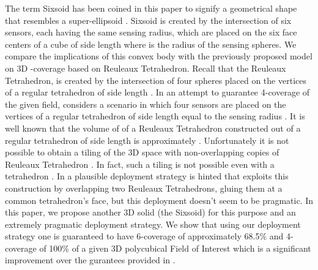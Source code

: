 \documentclass[conference]{IEEEtran}
\begin{document}
The term Sixsoid has been coined in this paper to signify a geometrical shape that resembles a super-ellipsoid \cite{W}. 
Sixsoid is created by the intersection of six sensors, each having the same sensing radius, which are placed on the six face centers of a cube of side length  where  is the radius of the sensing spheres. We compare the implications of this convex body with the previously proposed model on 3D -coverage based on Reuleaux Tetrahedron. Recall that the Reuleaux Tetrahedron, is created by the intersection of four spheres placed on the vertices of a regular tetrahedron of side length . In an attempt to guarantee 4-coverage of the given field, \cite{AD1} considers a scenario in which four sensors are placed on the vertices of a regular tetrahedron of side length equal to the sensing radius . It is well known that the volume of 
of a Reuleaux Tetrahedron constructed out of a regular tetrahedron of side length  is approximately  \cite{RT}. Unfortunately it is not
possible to obtain a tiling of the 3D space with non-overlapping copies of Reuleaux Tetrahedron \cite{A}. In fact, such a tiling is not
possible even with a tetrahedron \cite{MW}. In \cite{A} a plausible deployment strategy is hinted that exploits this construction by overlapping two Reuleaux Tetrahedrons, gluing them at a common tetrahedron's face, but this deployment doesn't seem to be pragmatic.  In this paper, we propose another 3D solid (the Sixsoid) for this purpose and an extremely pragmatic deployment strategy. We show that using our deployment strategy one is guaranteed to have 6-coverage of approximately 68.5\% and 4-coverage of 100\%  of a given 3D polycubical Field of Interest which is a significant improvement over the gurantees provided in \cite{A, AD1}.
\end{document}

